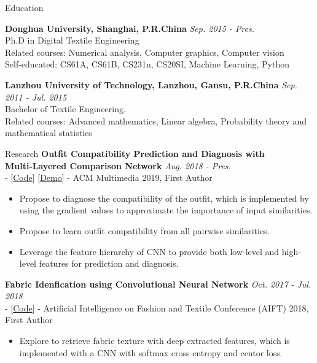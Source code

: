 \documentclass{resume} %
\begin{document}

\begin{rSection}{Education}

{\bf Donghua University, Shanghai, P.R.China} \hfill {\em Sep. 2015 - Pres.} 
\\ Ph.D in Digital Textile Engineering
\\ Related courses: Numerical analysis, Computer graphics, Computer vision
\\ Self-educated: CS61A, CS61B, CS231n, CS20SI, Machine Learning, Python

{\bf Lanzhou University of Technology, Lanzhou, Gansu, P.R.China} \hfill {\em Sep. 2011 - Jul. 2015} 
\\ Bachelor of Textile Engineering.
\\ Related courses: Advanced mathematics, Linear algebra, Probability theory and mathematical statistics


\end{rSection}
\begin{rSection}{Research}
{\bf Outfit Compatibility Prediction and Diagnosis with \\ Multi-Layered Comparison Network} \hfill {\em Aug. 2018 - Pres.}
\\ - [\href{https://github.com/WangXin93/fashion_compatibility_mcn}{Code}] [\href{Demo}{Demo}] - ACM Multimedia 2019, First Author
\begin{itemize}
    \item Propose to diagnose the compatibility of the outfit, which is implemented by using the gradient values to approximate the importance of input similarities.
    \item Propose to learn outfit compatibility from all pairwise similarities.
    \item Leverage the feature hierarchy of CNN to provide both low-level and high-level features for prediction and diagnosis.
\end{itemize}

{\bf Fabric Idenfication using Convolutional Neural Network} \hfill {\em Oct. 2017 - Jul. 2018}
\\ - [\href{https://github.com/WangXin93/FabricID}{Code}] - Artificial Intelligence on Fashion and Textile Conference (AIFT) 2018, First Author
\begin{itemize}
    \item Explore to retrieve fabric texture with deep extracted features, which is implemented with a CNN with softmax cross entropy and centor loss.
\end{itemize}

\end{rSection}
\end{document}
